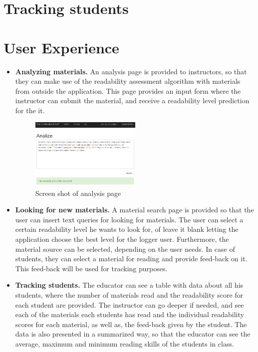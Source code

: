 \documentclass{sig-alternate-05-2015}
\begin{document}
\section{Tracking students}

\section{User Experience}

\begin{itemize}
\item \textbf{Analyzing materials.} An analysis page is provided to instructors, so that they can make use of the readability assessment algorithm \cite{imadrazo2016readability} with materials from outside the application. This page provides an input form where the instructor can submit the material, and receive a readability level prediction for the it.

\begin{figure}[h!]
 \centering
  \includegraphics[width=0.5\textwidth]{AnaliseScreenShot2}
 \caption{Screen shot of analysis page}
 \end{figure}
\item \textbf{Looking for new materials.} A material search page is provided so that the user can insert text queries for looking for materials. The user can select a certain readability level he wants to look for, of leave it blank letting the application choose the best level for the logger user. Furthermore, the material source can be selected, depending on the user needs. In case of students, they can select a material for reading and provide feed-back on it. This feed-back will be used for tracking purposes.


\item \textbf{Tracking students.} The educator can see a table with data about all his students, where the number of materials read and the readability score for each student are provided. The instructor can go deeper if needed, and see each of the materials each students has read and the individual readability scores for each material, as well as, the feed-back given by the student. The data is also presented in a summarized way, so that the educator can see the average, maximum and minimum reading skills of the students in class.

\end{itemize}
\end{document}
